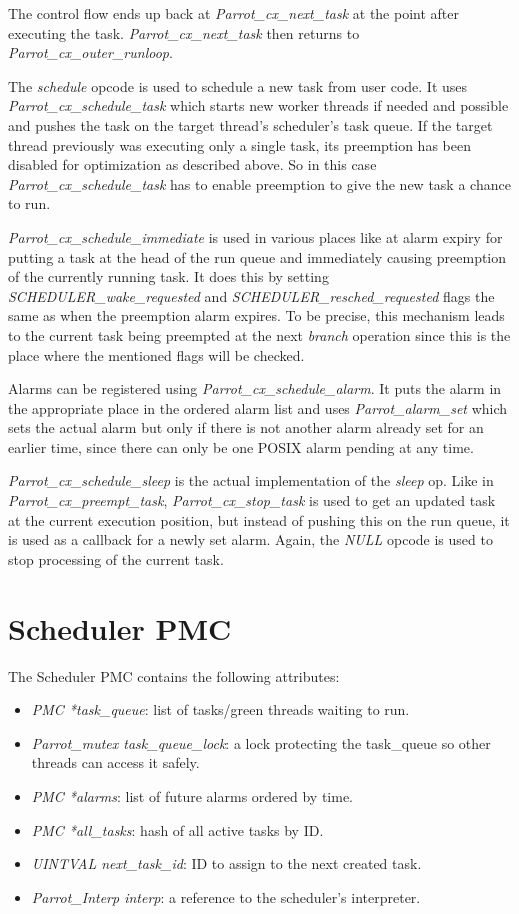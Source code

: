\documentclass[bachelor,english]{hgbthesis}
\begin{document}
The control flow ends up back at \textit{Parrot\_cx\_next\_task} at the point after executing the task. \textit{Parrot\_cx\_next\_task} then returns to \textit{Parrot\_cx\_outer\_runloop}.

The \textit{schedule} opcode is used to schedule a new task from user code. It uses \textit{Parrot\_cx\_schedule\_task} which starts new worker threads if needed and possible and pushes the task on the target thread's scheduler's task queue. If the target thread previously was executing only a single task, its preemption has been disabled for optimization as described above. So in this case \textit{Parrot\_cx\_schedule\_task} has to enable preemption to give the new task a chance to run.

\textit{Parrot\_cx\_schedule\_immediate} is used in various places like at alarm expiry for putting a task at the head of the run queue and immediately causing preemption of the currently running task. It does this by setting \textit{SCHEDULER\_wake\_requested} and \textit{SCHEDULER\_resched\_requested} flags the same as when the preemption alarm expires. To be precise, this mechanism leads to the current task being preempted at the next \textit{branch} operation since this is the place where the mentioned flags will be checked.

Alarms can be registered using \textit{Parrot\_cx\_schedule\_alarm}. It puts the alarm in the appropriate place in the ordered alarm list and uses \textit{Parrot\_alarm\_set} which sets the actual alarm but only if there is not another alarm already set for an earlier time, since there can only be one POSIX alarm pending at any time.

\textit{Parrot\_cx\_schedule\_sleep} is the actual implementation of the \textit{sleep} op. Like in \textit{Parrot\_cx\_preempt\_task}, \textit{Parrot\_cx\_stop\_task} is used to get an updated task at the current execution position, but instead of pushing this on the run queue, it is used as a callback for a newly set alarm. Again, the \textit{NULL} opcode is used to stop processing of the current task.

\section{Scheduler PMC}

The Scheduler PMC contains the following attributes:
%
\begin{itemize}
\item \textit{PMC *task\_queue}: list of tasks/green threads waiting to run.
\item \textit{Parrot\_mutex task\_queue\_lock}: a lock protecting the task\_queue so other threads can access it safely.
\item \textit{PMC *alarms}: list of future alarms ordered by time.
\item \textit{PMC *all\_tasks}: hash of all active tasks by ID.
\item \textit{UINTVAL next\_task\_id}: ID to assign to the next created task.
\item \textit{Parrot\_Interp interp}: a reference to the scheduler's interpreter.
\end{itemize}
\end{document}

